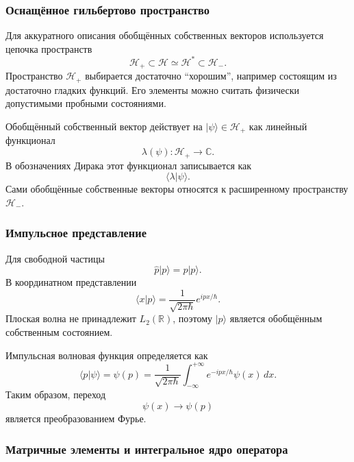 \documentclass[12pt,a4paper]{article}
\begin{document}
\subsubsection{Оснащённое гильбертово пространство}

Для аккуратного описания обобщённых собственных векторов используется
цепочка пространств
\[
    \boxed{
        \mathcal H_+
        \subset
        \mathcal H
        \simeq
        \mathcal H^*
        \subset
        \mathcal H_-
    }.
\]
Пространство $\mathcal H_+$ выбирается достаточно ``хорошим'', например
состоящим из достаточно гладких функций. Его элементы можно считать
физически допустимыми пробными состояниями.

Обобщённый собственный вектор действует на
$|\psi\rangle\in\mathcal H_+$ как линейный функционал
\[
    \lambda(\psi):
    \mathcal H_+\to\mathbb C.
\]
В обозначениях Дирака этот функционал записывается как
\[
    \langle\lambda|\psi\rangle.
\]
Сами обобщённые собственные векторы относятся к расширенному
пространству $\mathcal H_-$.


\subsubsection{Импульсное представление}

Для свободной частицы
\[
    \hat p|p\rangle
    =
    p|p\rangle.
\]
В координатном представлении
\[
    \boxed{
        \langle x|p\rangle
        =
        \frac{1}{\sqrt{2\pi\hbar}}
        e^{ipx/\hbar}
    }.
\]
Плоская волна не принадлежит $L_2(\mathbb R)$, поэтому $|p\rangle$
является обобщённым собственным состоянием.

Импульсная волновая функция определяется как
\[
    \boxed{
    \langle p|\psi\rangle
    =
    \psi(p)
    =
    \frac{1}{\sqrt{2\pi\hbar}}
    \int_{-\infty}^{+\infty}
        e^{-ipx/\hbar}\psi(x)\,dx
    }.
\]
Таким образом, переход
\[
    \psi(x)\longrightarrow\psi(p)
\]
является преобразованием Фурье.


\subsubsection{Матричные элементы и интегральное ядро оператора}
\end{document}
